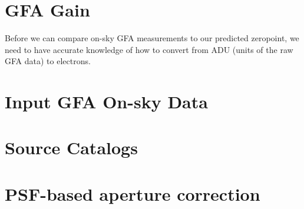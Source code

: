 \documentclass{article}
\begin{document}




\section{GFA Gain}

Before we can compare on-sky GFA measurements to our predicted zeropoint, we need to have accurate knowledge of how to convert from ADU (units of the raw GFA data) to electrons.



\section{Input GFA On-sky Data}



\section{Source Catalogs}

\section{PSF-based aperture correction}

\end{document}
